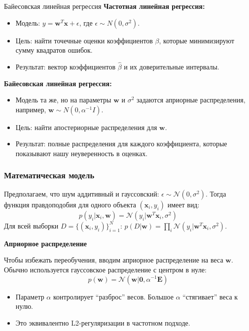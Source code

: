 \documentclass[notheorems, handout]{beamer}
\newcommand{\vect}[1]{\mathbf{#1}}
\newcommand{\matr}[1]{\boldsymbol{#1}}
\begin{document}
\begin{frame}{Байесовская линейная регрессия}
  \textbf{Частотная линейная регрессия:}
  \begin{itemize}
    \item Модель: $y = \vect{w}^T\vect{x} + \epsilon$, где $\epsilon
      \sim N(0, \sigma^2)$.
    \item Цель: найти точечные оценки коэффициентов $\beta$, которые
      минимизируют сумму квадратов ошибок.
    \item Результат: вектор коэффициентов $\hat{\beta}$ и их
      доверительные интервалы.
  \end{itemize}
  \vspace{0.5cm}
  \textbf{Байесовская линейная регрессия:}
  \begin{itemize}
    \item Модель та же, но на параметры $\vect{w}$ и $\sigma^2$
      задаются априорные распределения, например, $\vect{w} \sim N(0,
      \alpha^{-1}I)$.
    \item Цель: найти апостериорные распределения для $\vect{w}$.
    \item Результат: полные распределения для каждого коэффициента,
      которые показывают нашу неуверенность в оценках.
  \end{itemize}
\end{frame}
\begin{frame}
  \frametitle{Математическая модель}
  Предполагаем, что шум аддитивный и гауссовский: $\epsilon \sim
  \mathcal{N}(0, \sigma^2)$.
  Тогда функция правдоподобия для одного объекта $(\vect{x}_i, y_i)$ имеет вид:
  $$ p(y_i|\vect{x}_i, \vect{w}) = \mathcal{N}(y_i |
  \vect{w}^T\vect{x}_i, \sigma^2) $$
  Для всей выборки $D = \{(\vect{x}_i, y_i)\}_{i=1}^N$:
  $p(D|\vect{w}) = \prod_i \mathcal{N}(y_i | \vect{w}^T\vect{x}_i, \sigma^2)$.

  \vspace{1em}
  \textbf{Априорное распределение}

  Чтобы избежать переобучения, вводим априорное распределение на веса
  $\vect{w}$. Обычно используется гауссовское распределение с центром в нуле:
  $$ p(\vect{w}) = \mathcal{N}(\vect{w} | \vect{0}, \alpha^{-1}\matr{E}) $$
  \begin{itemize}
    \item Параметр $\alpha$ контролирует ``разброс'' весов. Большое
      $\alpha$ ``стягивает'' веса к нулю.
    \item Это эквивалентно L2-регуляризации в частотном подходе.
  \end{itemize}
\end{frame}
\end{document}
